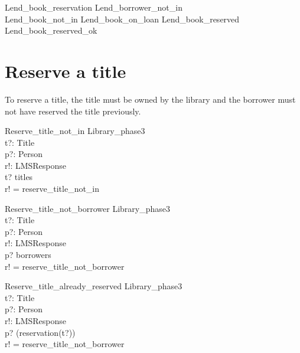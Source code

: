 \documentclass[11pt, fuzz]{article}
\begin{document}
\begin{zed}
Lend\_book\_reservation  Lend\_borrower\_not\_in \lor \\ Lend\_book\_not\_in \lor Lend\_book\_on\_loan \lor Lend\_book\_reserved \lor \\ Lend\_book\_reserved\_ok
\end{zed}

\section{Reserve a title}

To reserve a title, the title must be owned by the library and the borrower must not have reserved the title previously. 

\begin{schema}{Reserve\_title\_not\_in}
    \Xi Library\_phase3 \\
    t?: Title           \\
    p?: Person          \\
    r!: LMSResponse     \\
\where
    t? \notin titles \\
    r! = reserve\_title\_not\_in \\
\end{schema}

\begin{schema}{Reserve\_title\_not\_borrower}
    \Xi Library\_phase3 \\
    t?: Title           \\
    p?: Person          \\
    r!: LMSResponse     \\
\where
    p? \notin borrowers                \\
    r! = reserve\_title\_not\_borrower
\end{schema}

\begin{schema}{Reserve\_title\_already\_reserved}
    \Xi Library\_phase3 \\
    t?: Title           \\
    p?: Person          \\
    r!: LMSResponse     \\
\where
    p? \in \ran(reservation(t?))    \\
    r! = reserve\_title\_not\_borrower
\end{schema}
\end{document}

